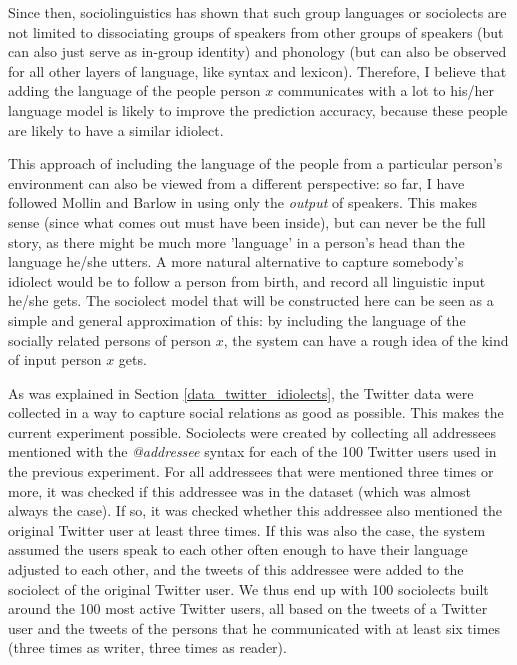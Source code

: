\documentclass[11pt]{article}
\begin{document}
Since then, sociolinguistics has shown that such group languages or sociolects are not limited to dissociating groups of speakers from other groups of speakers (but can also just serve as in-group identity) and phonology (but can also be observed for all other layers of language, like syntax and lexicon). Therefore, I believe that adding the language of the people person $x$ communicates with a lot to his/her language model is likely to improve the prediction accuracy, because these people are likely to have a similar idiolect.

This approach of including the language of the people from a particular person's environment can also be viewed from a different perspective: so far, I have followed Mollin  and Barlow in using only the \emph{output} of speakers. This makes sense (since what comes out must have been inside), but can never be the full story, as there might be much more 'language' in a person's head than the language he/she utters. A more natural alternative to capture somebody's idiolect would be to follow a person from birth, and record all linguistic input he/she gets. The sociolect model that will be constructed here can be seen as a simple and general approximation of this: by including the language of the socially related persons of person $x$, the system can have a rough idea of the kind of input person $x$ gets.

As was explained in Section \ref{data_twitter_idiolects}, the Twitter data were collected in a way to capture social relations as good as possible. This makes the current experiment possible. Sociolects were created by collecting all addressees mentioned with the \emph{@addressee} syntax for each of the 100 Twitter users used in the previous experiment. For all addressees that were mentioned three times or more, it was checked if this addressee was in the dataset (which was almost always the case). If so, it was checked whether this addressee also mentioned the original Twitter user at least three times. If this was also the case, the system assumed the users speak to each other often enough to have their language adjusted to each other, and the tweets of this addressee were added to the sociolect of the original Twitter user. We thus end up with 100 sociolects built around the 100 most active Twitter users, all based on the tweets of a Twitter user and the tweets of the persons that he communicated with at least six times (three times as writer, three times as reader).
\end{document}
